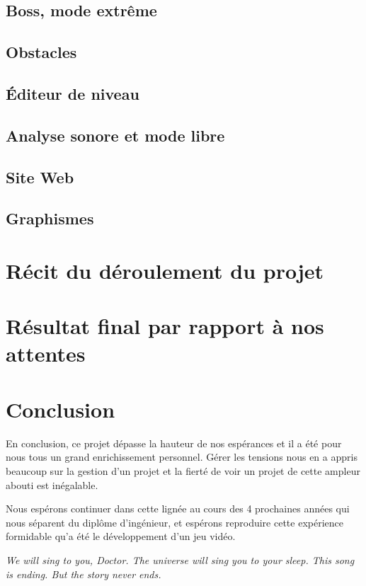 \documentclass[12pt,a4paper]{article}
\begin{document}
		\subsection{Boss, mode extrême}
			
		\subsection{Obstacles}
			
		\subsection{Éditeur de niveau}
			
		\subsection{Analyse sonore et mode libre}
			
		\subsection{Site Web}
			
		\subsection{Graphismes}
			
	
	\section{Récit du déroulement du projet}
			
			
	\section{Résultat final par rapport à nos attentes}
		
	
	\section{Conclusion}
		\par En conclusion, ce projet dépasse la hauteur de nos espérances et il a été pour nous tous un grand enrichissement personnel. Gérer les tensions nous en a appris beaucoup sur la gestion d'un projet et la fierté de voir un projet de cette ampleur abouti est inégalable.
		\par Nous espérons continuer dans cette lignée au cours des 4 prochaines années qui nous séparent du diplôme d'ingénieur, et espérons reproduire cette expérience formidable qu'a été le développement d'un jeu vidéo.
		\vspace{2cm}		
		\par \emph{We will sing to you, Doctor. The universe will sing you to your sleep. This song is ending. But the story never ends.}
\end{document}
